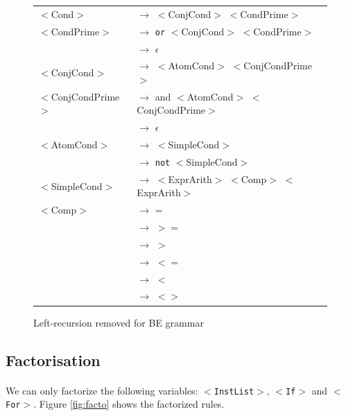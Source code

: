 \documentclass[letterpaper]{article}
\begin{document}
\begin{figure}[H]
    \centering
    \begin{tabular}{l l}
        $<$Cond$>$ & $\rightarrow$ $<$ConjCond$>$ $<$CondPrime$>$ \\


        $<$CondPrime$>$ & $\rightarrow$
        \texttt{or} $<$ConjCond$>$ $<$CondPrime$>$ \\
         & $\rightarrow$ $\epsilon$ \\

        $<$ConjCond$>$ & $\rightarrow$ $<$AtomCond$>$ $<$ConjCondPrime$>$ \\


        $<$ConjCondPrime$>$ & $\rightarrow$
        and $<$AtomCond$>$ $<$ConjCondPrime$>$ \\
         & $\rightarrow$ $\epsilon$\\

        $<$AtomCond$>$ & $\rightarrow$ $<$SimpleCond$>$\\
         & $\rightarrow$ \texttt{not} $<$SimpleCond$>$\\

        $<$SimpleCond$>$ & $\rightarrow$
        $<$ExprArith$>$ $<$Comp$>$ $<$ExprArith$>$\\

        $<$Comp$>$ & $\rightarrow$ =\\
         & $\rightarrow$ $>=$\\
         & $\rightarrow$ $>$\\
         & $\rightarrow$ $<=$\\
         & $\rightarrow$ $<$\\
         & $\rightarrow$ $<>$\\

    \end{tabular}
    \caption{Left-recursion removed for BE grammar}
    \label{fig:BE-noleft}
\end{figure}

\subsection{Factorisation}

\paragraph{}

We can only factorize the following variables:
\texttt{$<$InstList$>$}, \texttt{$<$If$>$} and \texttt{$<$For$>$}.
Figure \ref{fig:facto} shows the factorized rules.
\end{document}
